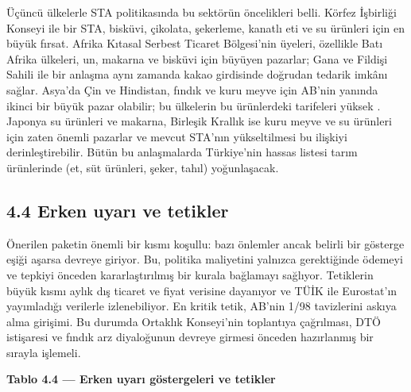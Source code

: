 Üçüncü ülkelerle STA politikasında bu sektörün öncelikleri belli. Körfez İşbirliği Konseyi ile bir STA, bisküvi, çikolata, şekerleme, kanatlı eti ve su ürünleri için en büyük fırsat. Afrika Kıtasal Serbest Ticaret Bölgesi'nin üyeleri, özellikle Batı Afrika ülkeleri, un, makarna ve bisküvi için büyüyen pazarlar; Gana ve Fildişi Sahili ile bir anlaşma aynı zamanda kakao girdisinde doğrudan tedarik imkânı sağlar. Asya'da Çin ve Hindistan, fındık ve kuru meyve için AB'nin yanında ikinci bir büyük pazar olabilir; bu ülkelerin bu ürünlerdeki tarifeleri yüksek \etiketD{}. Japonya su ürünleri ve makarna, Birleşik Krallık ise kuru meyve ve su ürünleri için zaten önemli pazarlar ve mevcut STA'nın yükseltilmesi bu ilişkiyi derinleştirebilir. Bütün bu anlaşmalarda Türkiye'nin hassas listesi tarım ürünlerinde (et, süt ürünleri, şeker, tahıl) yoğunlaşacak.

\hypertarget{nace_kartlar_10-12-44-erken-uyarux131-ve-tetikler}{%
\subsection{4.4 Erken uyarı ve tetikler}\label{nace_kartlar_10-12-44-erken-uyarux131-ve-tetikler}}

Önerilen paketin önemli bir kısmı koşullu: bazı önlemler ancak belirli bir gösterge eşiği aşarsa devreye giriyor. Bu, politika maliyetini yalnızca gerektiğinde ödemeyi ve tepkiyi önceden kararlaştırılmış bir kurala bağlamayı sağlıyor. Tetiklerin büyük kısmı aylık dış ticaret ve fiyat verisine dayanıyor ve TÜİK ile Eurostat'ın yayımladığı verilerle izlenebiliyor. En kritik tetik, AB'nin 1/98 tavizlerini askıya alma girişimi. Bu durumda Ortaklık Konseyi'nin toplantıya çağrılması, DTÖ istişaresi ve fındık arz diyaloğunun devreye girmesi önceden hazırlanmış bir sırayla işlemeli.


\textbf{Tablo 4.4 --- Erken uyarı göstergeleri ve tetikler}

\nopagebreak[4]

\begingroup\gbtablo\small

